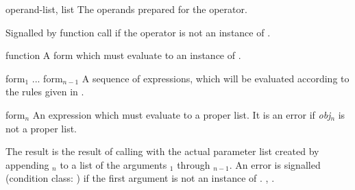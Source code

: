 \begin{optDefinition}
\begin{initoptions}
    \item[operand-list, list] The operands prepared for the operator.
\end{initoptions}
%
\remarks%
Signalled by function call if the operator is not an instance of
.

%
\Syntax
{}%
%
\begin{arguments}
    \item[function] A form which must evaluate to an instance of
    .

    \item[form$_1$ ... form$_{n-1}$] A sequence of expressions, which will be
    evaluated according to the rules given in .

    \item[form$_n$] An expression which must evaluate to a proper list.  It is
    an error if {\em obj$_n$} is not a proper list.
\end{arguments}
%
\result%
The result is the result of calling  with the actual parameter
list created by appending $_n$ to a list of the arguments
$_1$ through $_{n-1}$.  An error is signalled (condition
class: ) if the
first argument is not an instance of .
%
\seealso%
, .
\end{optDefinition}

